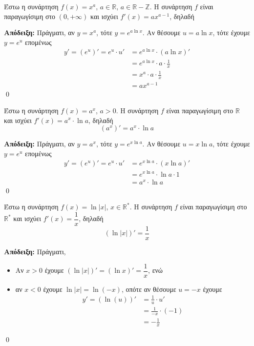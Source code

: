 \documentclass[a4paper, 12pt]{article}
\renewenvironment{proof}[1][\textbf{Απόδειξη}]{%
  \par\noindent\textbf{#1:} \rmfamily}{\qed\par}
\begin{document}
\begin{theorem}{}
  Έστω η συνάρτηση $f(x)=x^a$, $a\in\mathbb{R}$, $a\in\mathbb{R}-\mathbb{Z}$. Η συνάρτηση $f$ είναι παραγωγίσιμη στο $(0,+\infty)$ και ισχύει $f'(x)=ax^{a-1}$, δηλαδή
\end{theorem}
\begin{proof}
  Πράγματι, αν $y=x^a$, τότε $y=e^{a\ln x}$. Αν θέσουμε $u=a\ln x$, τότε έχουμε $y=e^u$ επομένως
  \begin{align*}
    y'=(e^u)'=e^u\cdot u' & =e^{a\ln x}\cdot (a\ln x)'          \\
                          & =e^{a\ln x}\cdot a\cdot \frac{1}{x} \\
                          & =x^a\cdot a\cdot \frac{1}{x}        \\
                          & =ax^{a-1}
  \end{align*}
\end{proof}

\begin{theorem}{}
  Έστω η συνάρτηση $f(x)=a^x$, $a>0$. Η συνάρτηση $f$ είναι παραγωγίσιμη στο $\mathbb{R}$ και ισχύει $f'(x)=a^x\cdot \ln a$, δηλαδή
  $$(a^x)'=a^x\cdot \ln a$$
\end{theorem}
\begin{proof}
  Πράγματι, αν $y=a^x$, τότε $y=e^{x\ln a}$. Αν θέσουμε $u=x\ln a$, τότε έχουμε $y=e^u$ επομένως
  \begin{align*}
    y'=(e^u)'=e^u\cdot u' & =e^{x\ln a}\cdot (x\ln a)'    \\
                          & =e^{x\ln a}\cdot \ln a\cdot 1 \\
                          & =a^x\cdot \ln a
  \end{align*}
\end{proof}

\begin{theorem}{}
  Έστω η συνάρτηση $f(x)=\ln |x|$, $x\in\mathbb{R}^*$. Η συνάρτηση $f$ είναι παραγωγίσιμη στο $\mathbb{R}^*$ και ισχύει $f'(x)=\dfrac{1}{x}$, δηλαδή
  $$(\ln |x|)'=\frac{1}{x}$$
\end{theorem}
\begin{proof}
  Πράγματι,
  \begin{itemize}
    \item Αν $x>0$ έχουμε $(\ln|x|)'=(\ln x)'=\dfrac{1}{x}$, ενώ
    \item αν $x<0$ έχουμε $\ln|x|=\ln(-x)$, οπότε αν θέσουμε $u=-x$ έχουμε
          \begin{align*}
            y'=(\ln(u))' & =\frac{1}{u}\cdot u'    \\
                         & =\frac{1}{-x}\cdot (-1) \\
                         & =-\frac{1}{x}
          \end{align*}
  \end{itemize}
\end{proof}
\end{document}

